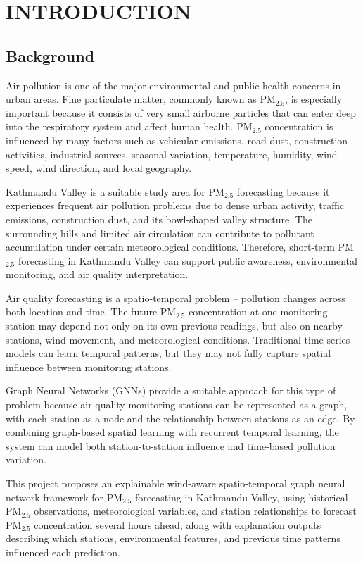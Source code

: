 \chapter{INTRODUCTION}


\section{Background}


Air pollution is one of the major environmental and public-health concerns in urban
areas. Fine particulate matter, commonly known as PM$_{2.5}$, is especially important because
it consists of very small airborne particles that can enter deep into the respiratory
system and affect human health. PM$_{2.5}$ concentration is influenced by many factors such as
vehicular emissions, road dust, construction activities, industrial sources, seasonal
variation, temperature, humidity, wind speed, wind direction, and local geography.

Kathmandu Valley is a suitable study area for PM$_{2.5}$ forecasting because it experiences
frequent air pollution problems due to dense urban activity, traffic emissions,
construction dust, and its bowl-shaped valley structure. The surrounding hills and
limited air circulation can contribute to pollutant accumulation under certain
meteorological conditions. Therefore, short-term PM$_{2.5}$ forecasting in Kathmandu Valley
can support public awareness, environmental monitoring, and air quality interpretation.

Air quality forecasting is a spatio-temporal problem -- pollution changes across both
location and time. The future PM$_{2.5}$ concentration at one monitoring station may depend
not only on its own previous readings, but also on nearby stations, wind movement, and
meteorological conditions. Traditional time-series models can learn temporal patterns,
but they may not fully capture spatial influence between monitoring stations.

Graph Neural Networks (GNNs) provide a suitable approach for this type of problem because
air quality monitoring stations can be represented as a graph, with each station as a
node and the relationship between stations as an edge. By combining graph-based spatial
learning with recurrent temporal learning, the system can model both station-to-station
influence and time-based pollution variation.

This project proposes an explainable wind-aware spatio-temporal graph neural network
framework for PM$_{2.5}$ forecasting in Kathmandu Valley, using historical PM$_{2.5}$ observations,
meteorological variables, and station relationships to forecast PM$_{2.5}$ concentration
several hours ahead, along with explanation outputs describing which stations,
environmental features, and previous time patterns influenced each prediction.

